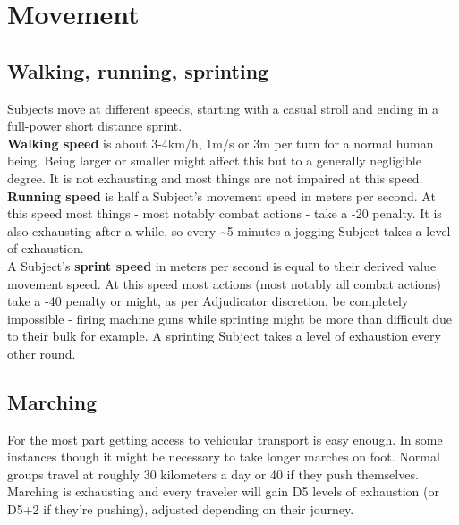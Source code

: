\documentclass[11pt,a4paper,openany,dvipsnames]{book}
\begin{document}
	

	\chapter{Movement}
	\section{Walking, running, sprinting}
	Subjects move at different speeds, starting with a casual stroll and ending in a full-power short distance sprint.\\
	\textbf{Walking speed} is about 3-4km/h, 1m/s or 3m per turn for a normal human being. Being larger or smaller might affect this but to a generally negligible degree. It is not exhausting and most things are not impaired at this speed.\\
	\textbf{Running speed} is half a Subject’s movement speed in meters per second.
	At this speed most things - most notably combat actions - take a -20 penalty.
	It is also exhausting after a while, so every \sim 5 minutes a jogging Subject takes a level of exhaustion.\\
	A Subject’s \textbf{sprint speed} in meters per second is equal to their derived value movement speed.
	At this speed most actions (most notably all combat actions)
		take a -40 penalty
		or might, as per Adjudicator discretion, be completely impossible
		- firing machine guns while sprinting might be more than difficult due to their bulk for example.
	A sprinting Subject takes a level of exhaustion every other round.
	\section{Marching}
	For the most part getting access to vehicular transport is easy enough.
	In some instances though it might be necessary to take longer marches on foot.
	Normal groups travel at roughly 30 kilometers a day or 40 if they push themselves.
	\\%
	Marching is exhausting and every traveler will gain D5 levels of exhaustion (or D5+2 if they're pushing), adjusted depending on their journey.
\end{document}
